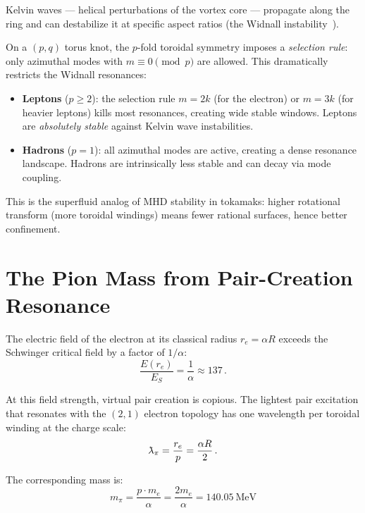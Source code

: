 \documentclass[11pt,a4paper]{article}
\newcommand{\lambdabar}{\mkern0.75mu\mathchar'26\mkern-9.75mu\lambda}
\begin{document}
Kelvin waves --- helical perturbations of the vortex core --- propagate
along the ring and can destabilize it at specific aspect ratios
(the Widnall instability~\cite{widnall1974}).

On a $(p,q)$ torus knot, the $p$-fold toroidal symmetry imposes a
\emph{selection rule}: only azimuthal modes with $m \equiv 0 \pmod{p}$
are allowed.  This dramatically restricts the Widnall resonances:
\begin{itemize}
\item \textbf{Leptons} ($p \geq 2$): the selection rule $m = 2k$
  (for the electron) or $m = 3k$ (for heavier leptons) kills most
  resonances, creating wide stable windows.  Leptons are
  \emph{absolutely stable} against Kelvin wave instabilities.
\item \textbf{Hadrons} ($p = 1$): all azimuthal modes are active,
  creating a dense resonance landscape.  Hadrons are intrinsically
  less stable and can decay via mode coupling.
\end{itemize}

This is the superfluid analog of MHD stability in tokamaks: higher
rotational transform (more toroidal windings) means fewer rational
surfaces, hence better confinement.


\section{The Pion Mass from Pair-Creation Resonance}
\label{sec:pion}

The electric field of the electron at its classical radius $r_e = \alpha R$
exceeds the Schwinger critical field by a factor of $1/\alpha$:
\begin{equation}
  \frac{E(r_e)}{E_S} = \frac{1}{\alpha} \approx 137\,.
  \label{eq:super_schwinger}
\end{equation}

At this field strength, virtual pair creation is copious.  The lightest
pair excitation that resonates with the $(2,1)$ electron topology has
one wavelength per toroidal winding at the charge scale:
\begin{equation}
  \lambdabar_\pi = \frac{r_e}{p} = \frac{\alpha R}{2}\,.
  \label{eq:lambda_pi}
\end{equation}

The corresponding mass is:
\begin{equation}
  \boxed{m_\pi = \frac{p \cdot m_e}{\alpha}
  = \frac{2m_e}{\alpha} = 140.05~\text{MeV}}
  \label{eq:mpi}
\end{equation}
\end{document}

